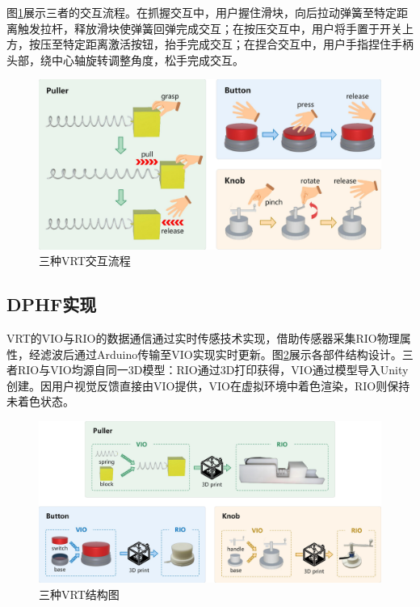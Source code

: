\documentclass[runningheads]{llncs}
\begin{document}
图\ref{fig:interaction-flow}展示三者的交互流程。在抓握交互中，用户握住滑块，向后拉动弹簧至特定距离触发拉杆，释放滑块使弹簧回弹完成交互；在按压交互中，用户将手置于开关上方，按压至特定距离激活按钮，抬手完成交互；在捏合交互中，用户手指捏住手柄头部，绕中心轴旋转调整角度，松手完成交互。

\begin{figure}[t]
  \centering
  \includegraphics[width=1\textwidth]{image/Interaction-Flow.pdf}
  \caption{三种VRT交互流程}
  \label{fig:interaction-flow}
\end{figure}

\subsection{DPHF实现}
VRT的VIO与RIO的数据通信通过实时传感技术实现，借助传感器采集RIO物理属性，经滤波后通过Arduino传输至VIO实现实时更新。图\ref{fig:structural-diagram}展示各部件结构设计。三者RIO与VIO均源自同一3D模型：RIO通过3D打印获得，VIO通过模型导入Unity创建。因用户视觉反馈直接由VIO提供，VIO在虚拟环境中着色渲染，RIO则保持未着色状态。

\begin{figure}[t]
  \centering
  \includegraphics[width=1\textwidth]{image/Structural-Diagram.pdf}
  \caption{三种VRT结构图}
  \label{fig:structural-diagram}
\end{figure}
\end{document}
